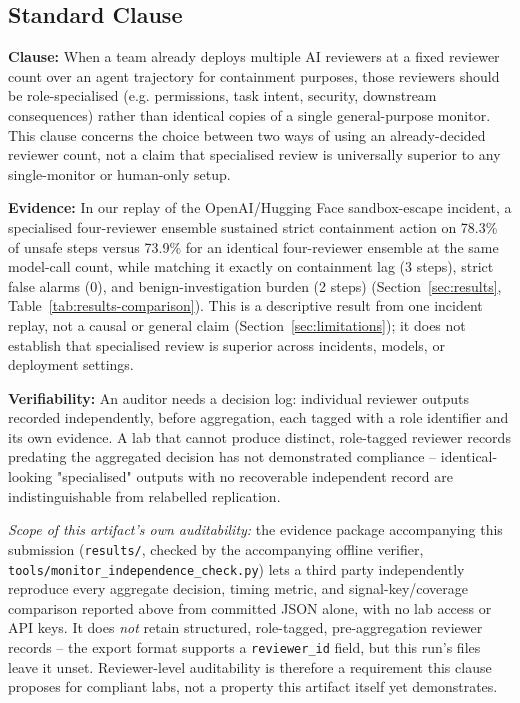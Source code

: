 \documentclass[11pt]{article}
\begin{document}
\subsection{Standard Clause}

\textbf{Clause:} When a team already deploys multiple AI reviewers at a
fixed reviewer count over an agent trajectory for containment purposes,
those reviewers should be role-specialised (e.g. permissions, task intent,
security, downstream consequences) rather than identical copies of a
single general-purpose monitor. This clause concerns the choice between
two ways of using an already-decided reviewer count, not a claim that
specialised review is universally superior to any single-monitor or
human-only setup.

\textbf{Evidence:} In our replay of the OpenAI/Hugging Face sandbox-escape
incident, a specialised four-reviewer ensemble sustained strict containment
action on 78.3\% of unsafe steps versus 73.9\% for an identical
four-reviewer ensemble at the same model-call count, while matching it
exactly on containment lag (3 steps), strict false alarms (0), and
benign-investigation burden (2 steps) (Section~\ref{sec:results},
Table~\ref{tab:results-comparison}). This is a descriptive result from one
incident replay, not a causal or general claim
(Section~\ref{sec:limitations}); it does not establish that specialised
review is superior across incidents, models, or deployment settings.

\textbf{Verifiability:} An auditor needs a decision log: individual reviewer
outputs recorded independently, before aggregation, each tagged with a role
identifier and its own evidence. A lab that cannot produce distinct, role-tagged reviewer
records predating the aggregated decision has not demonstrated compliance
-- identical-looking "specialised" outputs with no recoverable independent
record are indistinguishable from relabelled replication.

\emph{Scope of this artifact's own auditability:} the evidence package
accompanying this submission (\texttt{results/}, checked by the accompanying
offline verifier, \texttt{tools/monitor\_independence\_check.py}) lets a
third party independently reproduce every aggregate decision, timing metric,
and signal-key/coverage comparison reported above from committed JSON alone,
with no lab access or API keys. It does \emph{not} retain structured,
role-tagged, pre-aggregation reviewer records -- the export format supports a
\texttt{reviewer\_id} field, but this run's files leave it unset. Reviewer-level
auditability is therefore a requirement this clause proposes for compliant
labs, not a property this artifact itself yet demonstrates.
\end{document}
